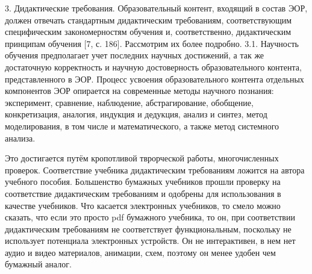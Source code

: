 3. Дидактические требования.
Образовательный контент, входящий в состав ЭОР, должен отвечать стандартным дидактическим требованиям, соответствующим специфическим закономерностям обучения и, соответственно, дидактическим принципам обучения [7, с. 186]. Рассмотрим их более подробно.
3.1. Научность обучения предполагает учет последних научных достижений, а так же достаточную корректность и научную достоверность образовательного контента, представленного в ЭОР. Процесс усвоения образовательного контента отдельных компонентов ЭОР опирается на современные методы научного познания: эксперимент, сравнение, наблюдение, абстрагирование, обобщение, конкретизация, аналогия, индукция и дедукция, анализ и синтез, метод моделирования, в том числе и математического, а также метод системного анализа. 

Это достигается путём кропотливой тврорческой работы, многочисленных проверок. Соответствие учебника дидактическим требованиям ложится на автора учебного пособия. Большенство бумажных учебников прошли проверку на соответствие дидактическим требованиям и одобрены для использования в качестве учебников. Что касается электронных учебников, то смело можно сказать, что если это просто pdf бумажного учебника, то он, при соответствии дидактическим требованиям не соответствует функциональным, поскольку не использует потенциала электронных устройств. Он не интерактивен, в нем нет аудио и видео материалов, анимации, схем, поэтому он менее удобен чем бумажный аналог.


